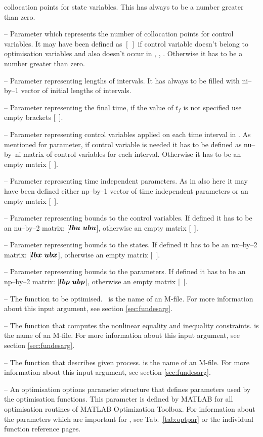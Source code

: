 \begin{description}
  collocation points for state variables. This has always to be a
  number greater than zero. 
\item[\argfun{ncolu}] -- Parameter which represents the number of
  collocation points for control variables. It may have been defined
  as $[~]$ if control variable doesn't belong to optimisation
  variables and also doesn't occur in , ,
  . Otherwise it has to be a number greater than zero.
\item[\argfun{li}] --  Parameter representing lengths of intervals. It
  has always to be filled with ni--by--1 vector of initial lengths of
  intervals. 
\item[\argfun{tf}] -- Parameter representing the final time, if the
  value of $t_{f}$ is not specified use empty brackets [~].
\item[\argfun{ui}] --  Parameter representing control variables
  applied on each time interval in . As mentioned for
   parameter, if control variable is needed it has to be
  defined as nu--by--ni matrix of control variables for each
  interval. Otherwise it has to be an empty matrix [~]. 
\item[\argfun{par}] -- Parameter representing time independent
  parameters. As in  also here it may have been defined
  either np--by--1 vector of time independent parameters or an empty
  matrix [~]. 
\item[\argfun{bdu}] -- Parameter representing bounds to the control
  variables. If defined it has to be an nu--by--2 matrix:
  [$\ve{lbu}~\ve{ubu}$], otherwise an empty matrix [~].
\item[\argfun{bdx}] -- Parameter representing bounds to the states. If
  defined it has to be an nx--by--2 matrix: [$\ve{lbx}~\ve{ubx}$],
  otherwise an empty matrix [~]. 
\item[\argfun{bdp}] -- Parameter representing bounds to the
  parameters. If defined it has to be an np--by--2 matrix:
  [$\ve{lbp}~\ve{ubp}$], otherwise an empty matrix [~].
\item[\argfun{objfun}] --  The function to be
  optimised.~ is the name of an M-file. For more
  information about this input argument, see section
  \ref{sec:fundesarg}. 
\item[\argfun{confun}] --  The function that computes the nonlinear
  equality and inequality constraints.  is the name of
  an M-file. For more information about this input argument, see
  section \ref{sec:fundesarg}.  
\item[\argfun{process}] -- The function that describes given
  process.  is the name of an M-file. For more
  information about this input argument, see section
  \ref{sec:fundesarg}. 
\item[\argfun{options}] -- An optimisation options parameter structure
  that defines parameters used by the optimisation functions. This
  parameter is defined by MATLAB for all optimisation routines of
  MATLAB Optimization Toolbox. For information about the parameters 
  which are important for , see Tab.~\ref{tab:optpar} or
  the individual function reference pages.
\end{description}

